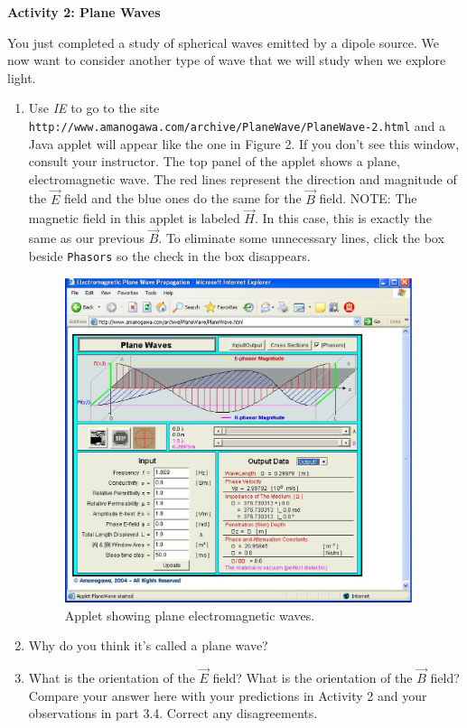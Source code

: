\textbf{Activity 2: Plane Waves}

You just completed a study of spherical waves emitted by a dipole source.
We now want to consider another type of wave that we will study when we explore light.

\begin{enumerate}

\item  Use {\it IE} to go to the site
{\tt \verb!http://www.amanogawa.com/archive/PlaneWave/PlaneWave-2.html!} and a Java applet will appear 
like the one in Figure 2. 
If you don't see this window, consult your instructor.
The top panel of the applet shows a plane, electromagnetic wave.
The red lines represent the direction and magnitude of the $\vec E$ field and the
blue ones do the same for the $\vec B$ field.
NOTE: The magnetic field in this applet is labeled $\vec H$.
In this case, this is exactly the same as our previous $\vec B$.
To eliminate some unnecessary lines, click the box beside {\tt Phasors} so the check in the box 
disappears.
\begin{figure}[hbt]
\begin{center}
\includegraphics[width=4.0in]{plane_waves/emwaves3.eps}
\caption{Applet showing plane electromagnetic waves.}
\end{center}
\end{figure}

\item Why do you think it's called a plane wave?
\vspace{2.0cm}

\item What is the orientation of the $\vec E$ field?
What is the orientation of the $\vec B$ field?
Compare your answer here with your predictions in Activity 2 and your observations in part 3.4.
Correct any disagreements.
\vspace{2.0cm}


\end{enumerate}
